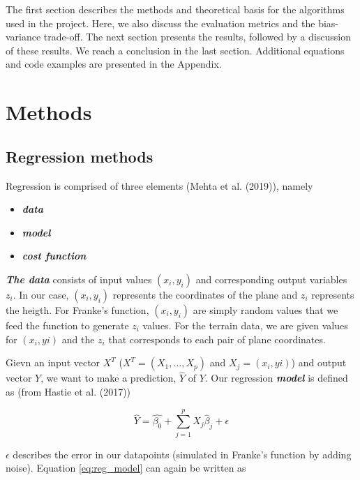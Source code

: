 \documentclass[a4paper]{article}
\begin{document}
The first section describes the methods and theoretical basis for the algorithms used in the project. Here, we also discuss the evaluation metrics and the bias-variance trade-off. The next section presents the results, followed by a discussion of these results. We reach a conclusion in the last section. Additional equations and code examples are presented in the Appendix.

\section{Methods}

\subsection{Regression methods}

Regression is comprised of three elements (Mehta et al. (2019)), namely 

\begin{itemize}
\item \textit{\textbf{data}}

\item \textit{\textbf{model}}

\item \textit{\textbf{cost function}}

\end{itemize}

\textit{\textbf{The data}} consists of input values $(x_{i}, y_{i})$ and corresponding output variables $z_{i}$. In our case, $(x_{i}, y_{i})$ represents the coordinates of the plane and $z_{i}$ represents the heigth. For Franke's function, $(x_{i}, y_{i})$ are simply random values that we feed the function to generate $z_{i}$ values. For the terrain data, we are given values for $(x_{i}, y{i})$ and the $z_{i}$ that corresponds to each pair of plane coordinates.
 
Gievn an input vector $X^{T}$ ($X^{T} = (X_{1}, \dots, X_{p})$ and $X_{j} = (x_{i}, y{i})$) and output vector $Y$, we want to make a prediction, $\hat{Y}$ of $Y$.
Our regression \textit{\textbf{model}} is defined as (from Hastie et al. (2017))

\begin{equation}
\hat{Y} =\hat{\beta_{0}} + \sum_{j = 1}^{p} X_{j} \hat{\beta}_{j} + \epsilon \label{eq:reg_model}
\end{equation}

$\epsilon$ describes the error in our datapoints (simulated in Franke's function by adding noise).
Equation \ref{eq:reg_model} can again be written as
\end{document}
